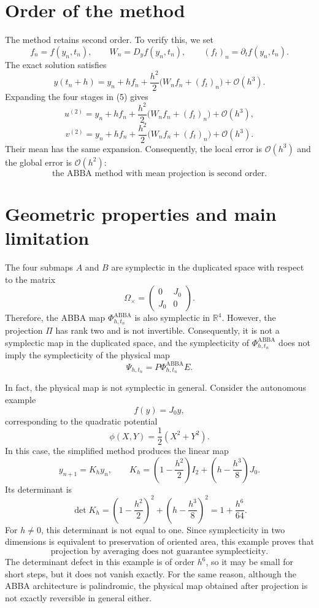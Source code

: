 \documentclass[11pt,a4paper]{article}
\newcommand{\R}{\mathbb{R}}
\newcommand{\Id}{I}
\newcommand{\Om}{\Omega_{\times}}
\newcommand{\PhiAB}{\Phi^{\mathrm{ABBA}}_{h,t_n}}
\begin{document}
\section{Order of the method}

The method retains second order. To verify this, we set
\[
 f_n=f(y_n,t_n),
 \qquad
 W_n=D_yf(y_n,t_n),
 \qquad
 (f_t)_n=\partial_t f(y_n,t_n).
\]
The exact solution satisfies
\[
 y(t_n+h)
 =y_n+h f_n
 +\frac{h^2}{2}\bigl(W_nf_n+(f_t)_n\bigr)
 +\mathcal O(h^3). \tag{9}
\]
Expanding the four stages in (5) gives
\[
 u^{(2)}
 =y_n+h f_n
 +\frac{h^2}{2}\bigl(W_nf_n+(f_t)_n\bigr)
 +\mathcal O(h^3),
\]
\[
 v^{(2)}
 =y_n+h f_n
 +\frac{h^2}{2}\bigl(W_nf_n+(f_t)_n\bigr)
 +\mathcal O(h^3).
\]
Their mean has the same expansion. Consequently, the local error is
\(\mathcal O(h^3)\) and the global error is \(\mathcal O(h^2)\):
\[
 \boxed{\text{the ABBA method with mean projection is second order}.}
\]

\section{Geometric properties and main limitation}

The four submaps \(A\) and \(B\) are symplectic in the duplicated space with respect to
the matrix
\[
 \Om=
 \begin{pmatrix}
  0&J_0\\
  J_0&0
 \end{pmatrix}.
\]
Therefore, the ABBA map \(\PhiAB\) is also symplectic in \(\R^4\). However, the
projection \(\Pi\) has rank two and is not invertible. Consequently, it is not a
symplectic map in the duplicated space, and the symplecticity of \(\PhiAB\) does not imply
the symplecticity of the physical map
\[
 \Psi_{h,t_n}=P\PhiAB E.
\]

In fact, the physical map is not symplectic in general. Consider the autonomous example
\[
 f(y)=J_0y,
\]
corresponding to the quadratic potential
\[
 \phi(X,Y)=\frac12(X^2+Y^2).
\]
In this case, the simplified method produces the linear map
\[
 y_{n+1}=K_hy_n,
 \qquad
 K_h=\left(1-\frac{h^2}{2}\right)\Id_2
     +\left(h-\frac{h^3}{8}\right)J_0.
\]
Its determinant is
\[
 \det K_h
 =\left(1-\frac{h^2}{2}\right)^2
  +\left(h-\frac{h^3}{8}\right)^2
 =1+\frac{h^6}{64}.
\]
For \(h\neq0\), this determinant is not equal to one. Since symplecticity in two
dimensions is equivalent to preservation of oriented area, this example proves that
\[
 \boxed{
 \text{projection by averaging does not guarantee symplecticity.}
 }
\]
The determinant defect in this example is of order \(h^6\), so it may be small for short
steps, but it does not vanish exactly. For the same reason, although the ABBA architecture
is palindromic, the physical map obtained after projection is not exactly reversible in
general either.
\end{document}
